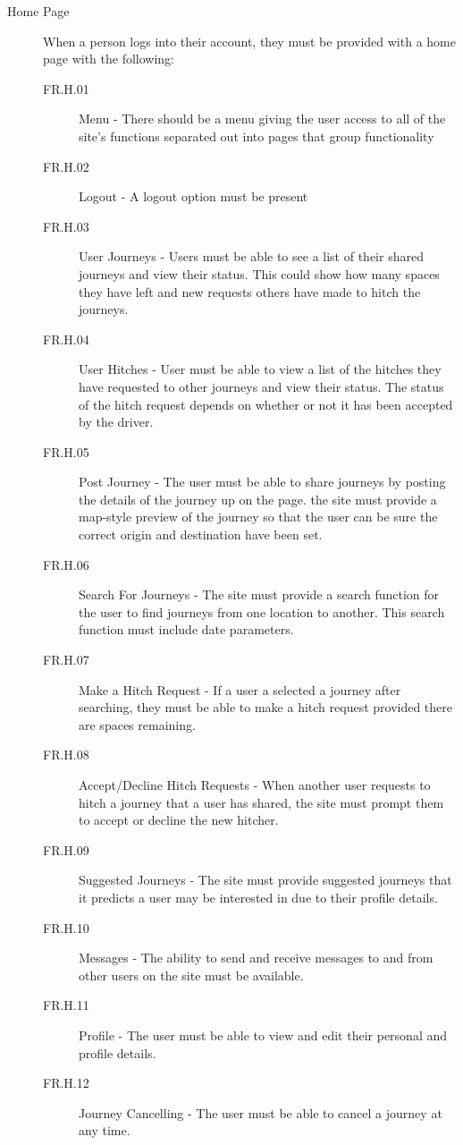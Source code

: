 \documentclass[11pt]{article}
\begin{document}
\begin{description}
\item[Home Page] When a person logs into their account, they must be provided with a home page with the following:
\begin{description}
\item[FR.H.01] Menu - There should be a menu giving the user access to all of the site's functions separated out into pages that group functionality 
\item[FR.H.02] Logout - A logout option must be present
\item[FR.H.03] User Journeys - Users must be able to see a list of their shared journeys and view their status. This could show how many spaces they have left and new requests others have made to hitch the journeys.
\item[FR.H.04] User Hitches - User must be able to view a list of the hitches they have requested to other journeys and view their status. The status of the hitch request depends on whether or not it has been accepted by the driver.
\item[FR.H.05] Post Journey - The user must be able to share journeys by posting the details of the journey up on the page. the site must provide a map-style preview of the journey so that the user can be sure the correct origin and destination have been set.
\item[FR.H.06] Search For Journeys - The site must provide a search function for the user to find journeys from one location to another. This search function must include date parameters.
\item[FR.H.07] Make a Hitch Request - If a user a selected a journey after searching, they must be able to make a hitch request provided there are spaces remaining.
\item[FR.H.08] Accept/Decline Hitch Requests - When another user requests to hitch a journey that a user has shared, the site must prompt them to accept or decline the new hitcher.
\item[FR.H.09] Suggested Journeys - The site must provide suggested journeys that it predicts a user may be interested in due to their profile details.
\item[FR.H.10] Messages - The ability to send and receive messages to and from other users on the site must be available.
\item[FR.H.11] Profile - The user must be able to view and edit their personal and profile details. 
\item[FR.H.12] Journey Cancelling - The user must be able to cancel a journey at any time.
\end{description}


\end{description}
\end{document}
